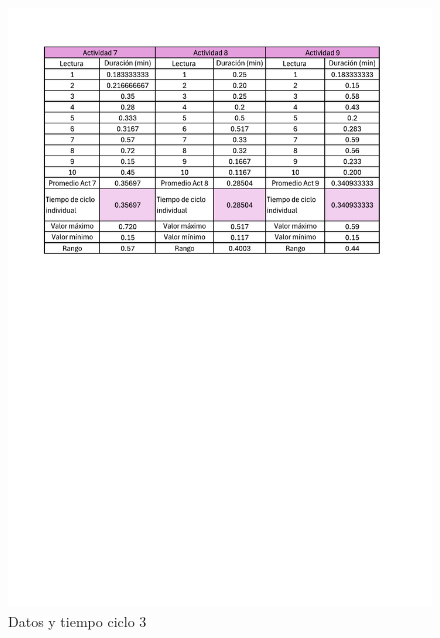     \begin{figure}[H]
        \centering
        \includegraphics[trim = {15mm 160mm 20mm 
        0mm},clip,scale=0.4]{16/Img/muestreo3}
        \caption{Datos y tiempo ciclo 3}
        \label{fig:Datos y tiempo ciclo 3}
         \end{figure}
    
